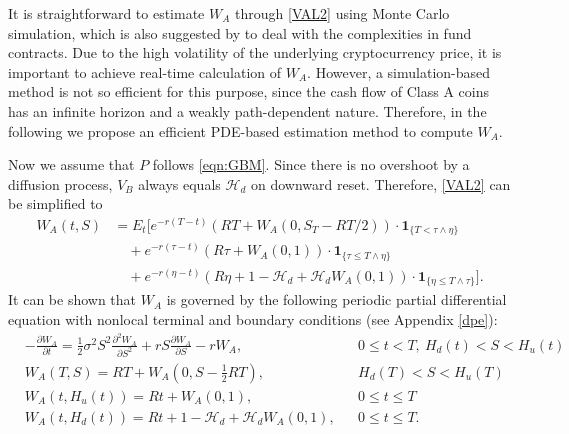 \documentclass[draft, noinfoline]{ectaart}
\numberwithin{equation}{section}
\theoremstyle{plain}
\begin{document}
 It is straightforward to estimate $W_A$ through \eqref{VAL2} using Monte Carlo simulation, which is also suggested by \cite{adams_risk_2006} to deal with the complexities in fund contracts. Due to the high volatility of the underlying cryptocurrency price, it is important to achieve real-time calculation of $W_A$. However, a simulation-based method is not so efficient for this purpose, since the cash flow of Class A coins has an infinite horizon and a weakly path-dependent nature. Therefore, in the following we propose an efficient PDE-based estimation method to compute $W_A$.

Now we assume that $P$ follows \eqref{eqn:GBM}. Since there is no overshoot by a diffusion process, $V_B$ always equals $\mathcal{H}_d$ on downward reset. Therefore, \eqref{VAL2} can be simplified to
\begin{align} \nonumber
W_{A}(t,S) & =E_{t}\Bigg[e^{-r(T-t)}(RT+W_A(0,S_T-RT/2))\cdot\mathbf{1}_{\{T<\tau\land\eta\}}\\ \label{srep0}
&\quad+e^{-r(\tau-t)}(R\tau+W_{A}(0,1))\cdot\mathbf{1}_{\{\tau\le T\land\eta\}}\\
 & \quad+e^{-r(\eta-t)}(R\eta+1-\mathcal{H}_d+\mathcal{H}_d W_{A}(0,1))\cdot\mathbf{1}_{\{\eta\le T\land\tau\}}\Bigg]. \nonumber
\end{align}
It can be shown that $W_{A}$ is governed by the following periodic partial differential equation with nonlocal terminal and boundary conditions (see Appendix \ref{dpe}):
\begin{align}\label{eqn:PDEstart}
&-\frac{\partial W_{A}}{\partial t} =\frac{1}{2}\sigma^{2}S^{2}\frac{\partial^{2}W_{A}}{\partial S^{2}}+r S\frac{\partial W_{A}}{\partial S}-r W_{A}, &&0\le t<T,~H_d(t)<S<H_u(t)\\\label{eqn:ter}
&W_{A}(T,S)  =RT+W_{A}(0,S-\frac{1}{2}RT),&&H_d(T)<S<H_u(T)\\\label{eqn:bound1}
&W_{A}(t,H_{u}(t))  =Rt+W_{A}(0,1),&&0\le t\le T\\\label{eqn:PDEend}
&W_{A}(t,H_d(t))  =Rt+1-\mathcal{H}_{d}+\mathcal{H}_{d}W_{A}(0,1),&&0\le t\le T.
\end{align}
\end{document}
